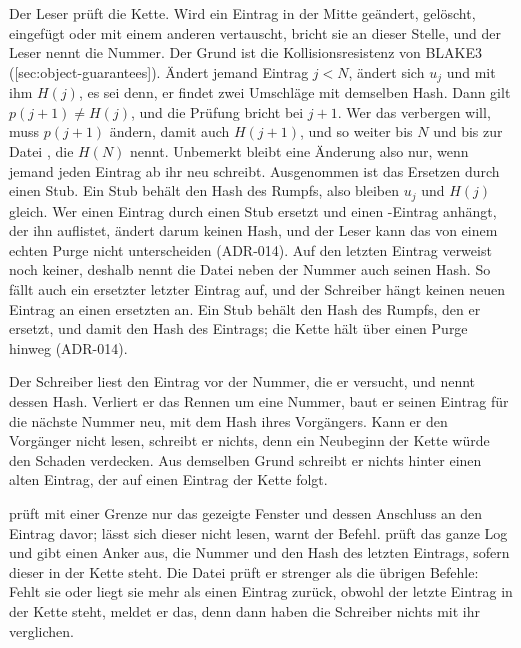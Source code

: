 {Der Leser prüft die Kette.
Wird ein Eintrag in der Mitte geändert, gelöscht, eingefügt oder mit einem anderen vertauscht,
bricht sie an dieser Stelle, und der Leser nennt die Nummer.
Der Grund ist die Kollisionsresistenz von BLAKE3 ([sec:object-guarantees]).
Ändert jemand Eintrag $j < N$, ändert sich $u_j$ und mit ihm $H(j)$,
es sei denn, er findet zwei Umschläge mit demselben Hash.
Dann gilt $p(j+1) \ne H(j)$, und die Prüfung bricht bei $j+1$.
Wer das verbergen will, muss $p(j+1)$ ändern, damit auch $H(j+1)$, und so weiter bis $N$
und bis zur Datei , die $H(N)$ nennt.
Unbemerkt bleibt eine Änderung also nur, wenn jemand jeden Eintrag ab ihr neu schreibt.
Ausgenommen ist das Ersetzen durch einen Stub.
Ein Stub behält den Hash des Rumpfs, also bleiben $u_j$ und $H(j)$ gleich.
Wer einen Eintrag durch einen Stub ersetzt und einen -Eintrag anhängt,
der ihn auflistet, ändert darum keinen Hash,
und der Leser kann das von einem echten Purge nicht unterscheiden (ADR-014).
Auf den letzten Eintrag verweist noch keiner,
deshalb nennt die Datei  neben der Nummer auch seinen Hash.
So fällt auch ein ersetzter letzter Eintrag auf,
und der Schreiber hängt keinen neuen Eintrag an einen ersetzten an.
Ein Stub behält den Hash des Rumpfs, den er ersetzt, und damit den Hash des Eintrags;
die Kette hält über einen Purge hinweg (ADR-014).

Der Schreiber liest den Eintrag vor der Nummer, die er versucht, und nennt dessen Hash.
Verliert er das Rennen um eine Nummer, baut er seinen Eintrag für die nächste Nummer neu,
mit dem Hash ihres Vorgängers.
Kann er den Vorgänger nicht lesen, schreibt er nichts,
denn ein Neubeginn der Kette würde den Schaden verdecken.
Aus demselben Grund schreibt er nichts hinter einen alten Eintrag,
der auf einen Eintrag der Kette folgt.

 prüft mit einer Grenze nur das gezeigte Fenster
und dessen Anschluss an den Eintrag davor;
lässt sich dieser nicht lesen, warnt der Befehl.
 prüft das ganze Log und gibt einen Anker aus,
die Nummer und den Hash des letzten Eintrags, sofern dieser in der Kette steht.
Die Datei  prüft er strenger als die übrigen Befehle:
Fehlt sie oder liegt sie mehr als einen Eintrag zurück,
obwohl der letzte Eintrag in der Kette steht, meldet er das,
denn dann haben die Schreiber nichts mit ihr verglichen.

}
